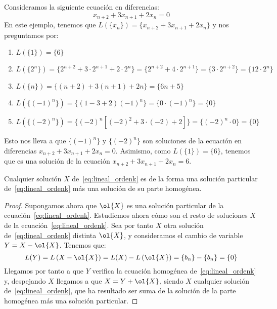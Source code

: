 \begin{ejemplo}\label{ejemplo:uso_L}
    Consideramos la siguiente ecuación en diferencias:
    \begin{equation*}
        x_{n+2} + 3x_{n+1} + 2x_n = 0
    \end{equation*}
    En este ejemplo, tenemos que $L(\{x_n\}) = \{x_{n+2} + 3x_{n+1} + 2x_n\}$ y nos preguntamos por:

    \begin{enumerate}
        \item $L(\{1\}) = \{6\}$
        \item $L(\{2^n\}) = \{2^{n+2} + 3\cdot 2^{n+1} + 2\cdot 2^n\} = \{2^{n+2} + 4\cdot 2^{n+1}\} = \{3\cdot 2^{n+2}\} =\{ 12\cdot 2^n\}$
        \item $L(\{n\}) = \{(n+2) + 3(n+1) + 2n\} = \{6n + 5\}$
        \item $L(\{{(-1)}^n\}) = \{(1 -3 + 2) (-1)^n\} = \{0\cdot (-1)^n\} = \{0\}$
        
        \item $L(\{{(-2)}^n\}) = \{(-2)^n[(-2)^2 + 3\cdot (-2) + 2]\} = \{(-2)^n\cdot 0\} = \{0\}$
    \end{enumerate}
    Esto nos lleva  a que $\{{(-1)}^n\}$ y $\{{(-2)}^n\}$ son soluciones de la ecuación en diferencias ${x_{n+2} + 3x_{n+1} + 2x_n = 0}$. Asimismo, como $L(\{1\}) = \{6\}$, tenemos que es una solución de la ecuación $x_{n+2} + 3x_{n+1} + 2x_n = 6$.
\end{ejemplo}

\begin{prop}
    Cualquier solución $X$ de~\ref{eq:lineal_ordenk} es de la forma una solución particular de~\ref{eq:lineal_ordenk} más una solución de su parte homogénea.
\end{prop}
\begin{proof}
Supongamos ahora que $\ol{X}$ es una solución particular de la ecuación~\ref{eq:lineal_ordenk}. Estudiemos ahora cómo son el resto de soluciones $X$ de la ecuación~\ref{eq:lineal_ordenk}. Sea por tanto $X$ otra solución de~\ref{eq:lineal_ordenk} distinta $\ol{X}$, y consideramos el cambio de variable $Y=X-\ol{X}$. Tenemos que:
\begin{equation*}
    L(Y) = L\left(X-\ol{X}\right) = L(X) - L\left(\ol{X}\right) = \{b_n\} - \{b_n\} = \{0\}
\end{equation*}
Llegamos por tanto a que $Y$ verifica la ecuación homogénea de~\ref{eq:lineal_ordenk} y, despejando $X$ llegamos a que $X = Y + \ol{X}$, siendo $X$ cualquier solución de~\ref{eq:lineal_ordenk}, que ha resultado ser suma de la solución de la parte homogénea más una solución particular.
\end{proof}

